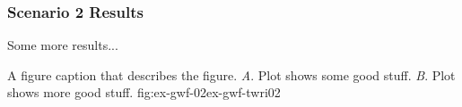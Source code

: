 \subsubsection{Scenario 2 Results}


Some more results...

\begin{StandardFigure}{
                                     A figure caption that describes the figure. 
                                     \textit{A}. Plot shows some good stuff.
                                     \textit{B}. Plot shows more good stuff.
                                     }{fig:ex-gwf-02}{ex-gwf-twri02}
\end{StandardFigure}                                 

